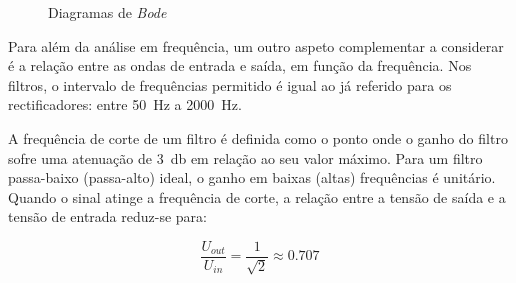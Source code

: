 \begin{figure}[hbtp]
	\centering%
		\centering
		\qquad
		\caption{Diagramas de \textit{Bode}  \cite{sedrasmith}}%
		\label{fig:Bodeesqgeral}%
\end{figure}

	Para além da análise em frequência, um outro aspeto complementar a considerar é a relação entre as ondas de entrada e saída, em função da frequência. Nos filtros, o intervalo de frequências permitido é igual ao já referido para os rectificadores: entre \SI{50}{\hertz} a \SI{2000}{\hertz}. 
	
	A frequência de corte de um filtro é definida como o ponto onde o ganho do filtro sofre uma atenuação de \SI{3}{\decibel} em relação ao seu valor máximo. 	Para um filtro passa-baixo (passa-alto) ideal, o ganho em baixas (altas) frequências é unitário. Quando o sinal atinge a frequência de corte, a relação entre a tensão de saída e a tensão de entrada reduz-se para:  
	
	\begin{equation} \label{eq:relacaoGanho}
		\frac{U_{out}}{U_{in}} = \frac{1}{\sqrt{2}} \approx 0.707
	\end{equation}
	
